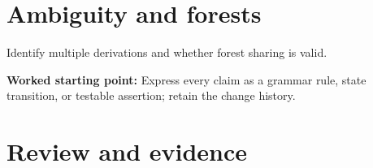 \documentclass[11pt,letterpaper]{article}
\begin{document}
\section{Ambiguity and forests}
Identify multiple derivations and whether forest sharing is valid.\par\textbf{Worked starting point:} Express every claim as a grammar rule, state transition, or testable assertion; retain the change history.
\section{Review and evidence}
\end{document}
